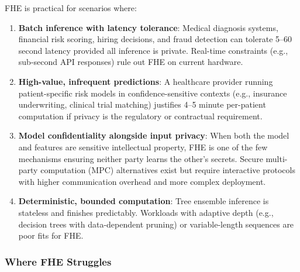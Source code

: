 \documentclass[12pt]{article}
\begin{document}
FHE is practical for scenarios where:
\begin{enumerate}
\item \textbf{Batch inference with latency tolerance}: Medical diagnosis systems, financial risk scoring, hiring decisions, and fraud detection can tolerate 5--60 second latency provided all inference is private. Real-time constraints (e.g., sub-second API responses) rule out FHE on current hardware.
\item \textbf{High-value, infrequent predictions}: A healthcare provider running patient-specific risk models in confidence-sensitive contexts (e.g., insurance underwriting, clinical trial matching) justifies 4--5 minute per-patient computation if privacy is the regulatory or contractual requirement.
\item \textbf{Model confidentiality alongside input privacy}: When both the model and features are sensitive intellectual property, FHE is one of the few mechanisms ensuring neither party learns the other's secrets. Secure multi-party computation (MPC) alternatives exist but require interactive protocols with higher communication overhead and more complex deployment.
\item \textbf{Deterministic, bounded computation}: Tree ensemble inference is stateless and finishes predictably. Workloads with adaptive depth (e.g., decision trees with data-dependent pruning) or variable-length sequences are poor fits for FHE.
\end{enumerate}

\subsubsection*{Where FHE Struggles}
\end{document}

